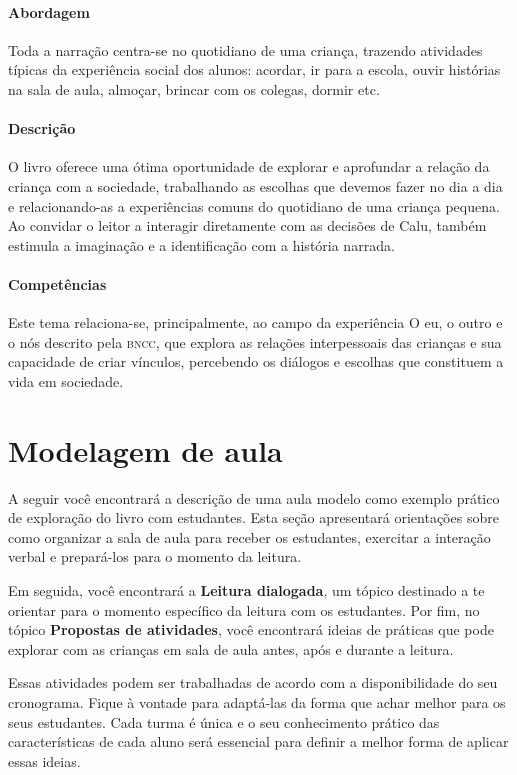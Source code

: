\documentclass[11pt]{extarticle}
\begin{document}
\paragraph{Abordagem} Toda a narração centra-se no quotidiano de uma criança, trazendo atividades típicas da experiência social dos alunos: acordar, ir para a escola, ouvir histórias na sala de aula, almoçar, brincar com os colegas, dormir etc.

\paragraph{Descrição} O livro oferece uma ótima oportunidade de explorar 
e aprofundar a relação da criança com a sociedade, trabalhando as escolhas que devemos fazer no dia a dia e relacionando-as a experiências comuns do quotidiano de uma criança pequena. Ao convidar o leitor a interagir diretamente com as decisões de Calu, também estimula a imaginação e a identificação com a história narrada.

\paragraph{Competências} Este tema relaciona-se, principalmente, ao 
campo da experiência O eu, o outro e o nós 
descrito pela \textsc{bncc}, que explora as relações interpessoais das crianças e sua capacidade de criar vínculos, percebendo os diálogos e escolhas que constituem a vida em sociedade.


\section{Modelagem de aula}
A seguir você encontrará a descrição de uma aula modelo como exemplo 
prático de exploração do livro com estudantes. Esta seção apresentará 
orientações sobre como organizar a sala de aula para receber os 
estudantes, exercitar a interação verbal e prepará-los para o 
momento da leitura.

Em seguida, você encontrará a \textbf{Leitura dialogada}, um 
tópico destinado a te orientar para o momento específico da 
leitura com os estudantes. Por fim, no tópico 
\textbf{Propostas de atividades}, você encontrará ideias 
de práticas que pode explorar com as crianças em sala de 
aula antes, após e durante a leitura. 

Essas atividades podem ser trabalhadas de acordo com a 
disponibilidade do seu cronograma. Fique à vontade para adaptá-las 
da forma que achar melhor para os seus estudantes. Cada turma é única 
e o seu conhecimento prático das características de cada aluno será 
essencial para definir a melhor forma de aplicar essas ideias. 
\end{document}

